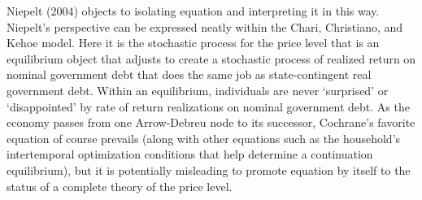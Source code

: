  Niepelt (2004) objects to isolating
  equation  and interpreting it in this way.  Niepelt's perspective can be expressed neatly within the  Chari, Christiano, and Kehoe model.
  Here it is the   stochastic process for the price level that  is  an equilibrium object that adjusts to create a stochastic process of realized
   return on nominal government debt that does the same job as state-contingent real government debt.   Within an equilibrium, individuals are never  `surprised' or `disappointed'
   by rate of return realizations on nominal government debt.  As the economy passes from one Arrow-Debreu node to its successor, Cochrane's favorite equation  of
   course prevails
   (along with other equations such as the household's intertemporal optimization conditions that help
   determine a continuation equilibrium), but it is  potentially   misleading to promote
   equation   by itself  to the status of a complete theory of the price level.



